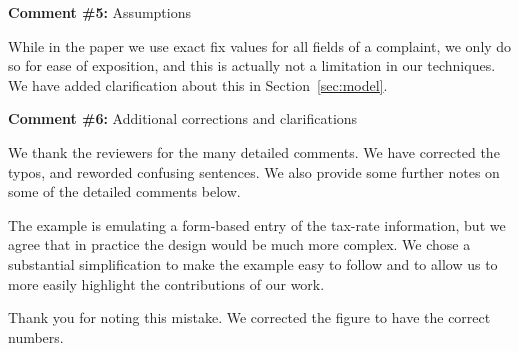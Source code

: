 \comskip

\noindent
\textbf{Comment \#5:} Assumptions
\begin{quote}
\end{quote}

While in the paper we use exact fix values for all fields of a complaint, we
only do so for ease of exposition, and this is actually not a limitation in
our techniques. We have added clarification about this in
Section~\ref{sec:model}.



\comskip

\noindent
\textbf{Comment \#6:} Additional corrections and clarifications

\smallskip

We thank the reviewers for the many detailed comments. We have corrected the
typos, and reworded confusing sentences. We also provide some further notes on
some of the detailed comments below.

\begin{quote}
\end{quote}

The example is emulating a form-based entry of the tax-rate information, but
we agree that in practice the design would be much more complex. We chose a
substantial simplification to make the example easy to follow and to allow us
to more easily highlight the contributions of our work.

\begin{quote}
\end{quote}

Thank you for noting this mistake. We corrected the figure to have the
correct numbers.


\begin{quote}
\end{quote}

